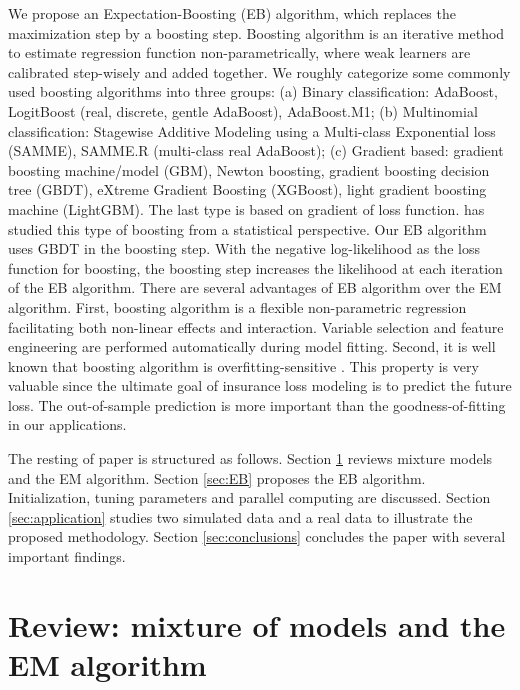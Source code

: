 \documentclass[11pt]{article}
\numberwithin{equation}{section}
\begin{document}
We propose an Expectation-Boosting (EB) algorithm, which replaces the maximization step by a boosting step. 
Boosting algorithm is an iterative method to estimate regression function non-parametrically, where weak learners are calibrated step-wisely and added together.
We roughly categorize some commonly used boosting algorithms into three groups: 
(a) Binary classification: {AdaBoost}, LogitBoost (real, discrete, gentle AdaBoost), AdaBoost.M1; 
(b) Multinomial classification: Stagewise Additive Modeling using a Multi-class Exponential loss (SAMME), SAMME.R (multi-class real AdaBoost); 
(c) {Gradient based}: {gradient boosting machine/model (GBM)}, Newton boosting, gradient boosting decision tree (GBDT), {eXtreme Gradient Boosting (XGBoost)}, {light gradient boosting machine (LightGBM)}.
The last type is based on {gradient of loss function}.  \citet{friedman2001greedy} has studied this type of boosting from a statistical perspective. Our EB algorithm uses GBDT in the boosting step.
With the negative log-likelihood as the loss function for boosting, the boosting step increases the likelihood at each iteration of the EB algorithm. 
There are several advantages of EB algorithm over the EM algorithm. 
First, boosting algorithm is a flexible non-parametric regression facilitating both non-linear effects and interaction. Variable selection and feature engineering are performed automatically during model fitting. 
Second, it is well known that boosting algorithm is overfitting-sensitive \citep{buehlmann:2003}. This property is very valuable since the ultimate goal of insurance loss modeling is to predict the future loss.
The out-of-sample prediction is more important than the goodness-of-fitting in our applications. 



The resting of paper is structured as follows. 
Section \ref{sec:review} reviews mixture models and the EM algorithm. 
Section \ref{sec:EB} proposes the EB algorithm. Initialization, tuning parameters and parallel computing are discussed.   
Section \ref{sec:application} studies two simulated data and a real data to illustrate the proposed methodology. Section \ref{sec:conclusions} concludes the paper with several important findings.  


\section{Review: mixture of models and the EM algorithm}\label{sec:review}
\end{document}
